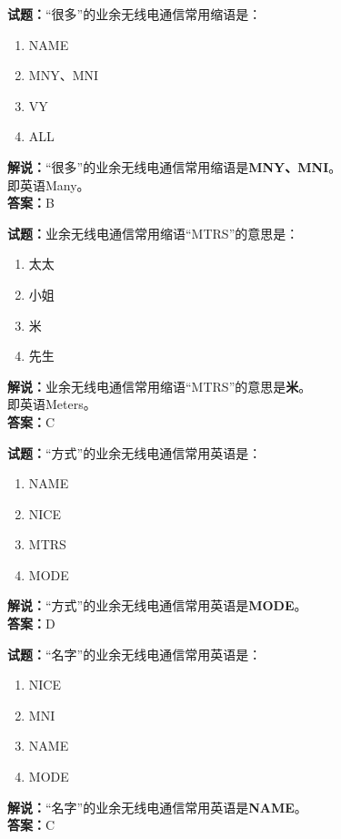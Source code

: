 \documentclass{ctexbook}
\begin{document}
\bigskip


\noindent\textbf{试题：}“很多”的业余无线电通信常用缩语是：
\begin{enumerate}[leftmargin=3em]
\item NAME
\item MNY、MNI
\item VY
\item ALL
\end{enumerate}
\noindent\textbf{解说：}“很多”的业余无线电通信常用缩语是\textbf{MNY、MNI}。\\即英语Many。\\\noindent\textbf{答案：}B



\bigskip


\noindent\textbf{试题：}业余无线电通信常用缩语“MTRS”的意思是：
\begin{enumerate}[leftmargin=3em]
\item 太太
\item 小姐
\item 米
\item 先生
\end{enumerate}
\noindent\textbf{解说：}业余无线电通信常用缩语“MTRS”的意思是\textbf{米}。\\即英语Meters。\\\noindent\textbf{答案：}C



\bigskip


\noindent\textbf{试题：}“方式”的业余无线电通信常用英语是：
\begin{enumerate}[leftmargin=3em]
\item NAME
\item NICE
\item MTRS
\item MODE
\end{enumerate}
\noindent\textbf{解说：}“方式”的业余无线电通信常用英语是\textbf{MODE}。\\\noindent\textbf{答案：}D



\bigskip


\noindent\textbf{试题：}“名字”的业余无线电通信常用英语是：
\begin{enumerate}[leftmargin=3em]
\item NICE
\item MNI
\item NAME
\item MODE
\end{enumerate}
\noindent\textbf{解说：}“名字”的业余无线电通信常用英语是\textbf{NAME}。\\\noindent\textbf{答案：}C
\end{document}
